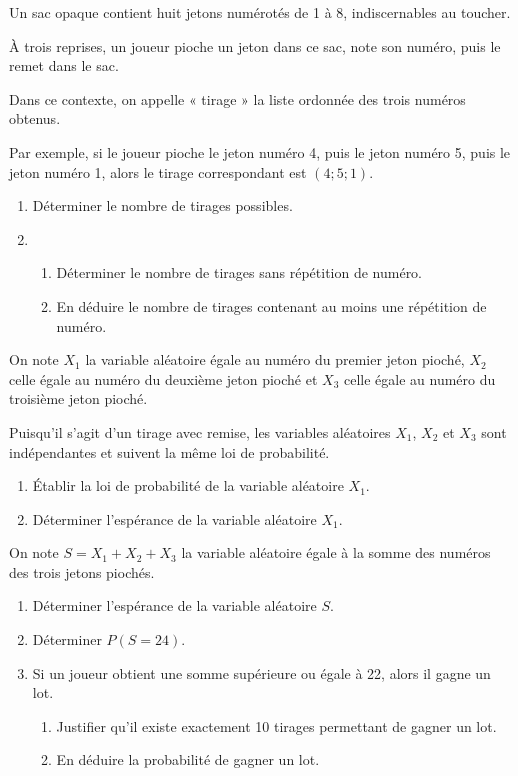 Un sac opaque contient huit jetons numérotés de 1 à 8, indiscernables au toucher.

À trois reprises, un joueur pioche un jeton dans ce sac, note son numéro, puis le remet dans le sac.

Dans ce contexte, on appelle « tirage » la liste ordonnée des trois numéros obtenus.

Par exemple, si le joueur pioche le jeton numéro 4, puis le jeton numéro 5, puis le jeton numéro 1, alors le tirage correspondant est $(4;5;1)$.

\begin{enumerate}
	\item Déterminer le nombre de tirages possibles.
	\item 
	\begin{enumerate}
		\item Déterminer le nombre de tirages sans répétition de numéro.
		\item En déduire le nombre de tirages contenant au moins une répétition de numéro.
	\end{enumerate}
\end{enumerate}

On note $X_1$ la variable aléatoire égale au numéro du premier jeton pioché, $X_2$ celle égale au numéro du deuxième jeton pioché et $X_3$ celle égale au numéro du troisième jeton pioché.

Puisqu’il s’agit d’un tirage avec remise, les variables aléatoires $X_1$, $X_2$ et $X_3$ sont indépendantes et suivent la même loi de probabilité.

\begin{enumerate}[resume]
	\item Établir la loi de probabilité de la variable aléatoire $X_1$.
	\item Déterminer l’espérance de la variable aléatoire $X_1$.
\end{enumerate}

On note $S = X_1 + X_2 + X_3$ la variable aléatoire égale à la somme des numéros des trois
jetons piochés.

\begin{enumerate}[resume]
	\item Déterminer l’espérance de la variable aléatoire $S$.
	\item Déterminer $P(S=24)$.
	\item Si un joueur obtient une somme supérieure ou égale à 22, alors il gagne un lot.
	\begin{enumerate}
		\item Justifier qu’il existe exactement 10 tirages permettant de gagner un lot.
		\item En déduire la probabilité de gagner un lot.
	\end{enumerate}
\end{enumerate}